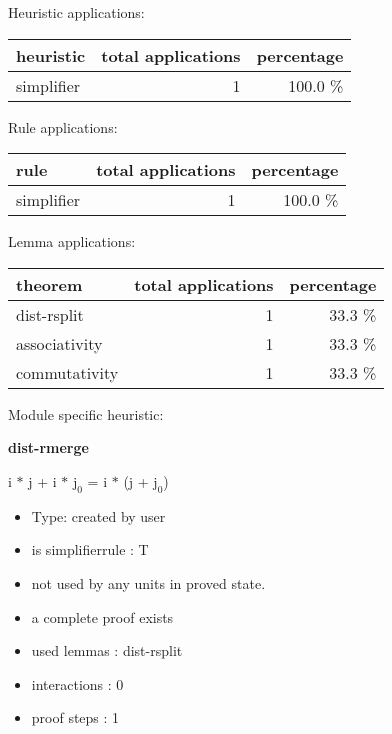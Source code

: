 \documentclass[a4paper]{article}
\begin{document}
Heuristic applications:

\begin{supertabular}{l|r|r}
heuristic	& total applications & percentage \\ \hline
simplifier & 1 & 100.0 \% \\

\end{supertabular}

Rule applications:

\begin{supertabular}{l|r|r}
rule	        & total applications & percentage \\ \hline
simplifier & 1 & 100.0 \% \\

\end{supertabular}

Lemma applications:

\begin{supertabular}{l|r|r}
theorem	        & total applications & percentage \\ \hline
dist-rsplit & 1 & 33.3 \% \\
associativity & 1 & 33.3 \% \\
commutativity & 1 & 33.3 \% \\

\end{supertabular}

Module specific heuristic:

\pagebreak

{\LARGE\bf dist-rmerge}\label{lemma-dist-rmerge}

\medskip

 \Fol i $*$ j + i $*$ $\mbox{j}_{0}$ = i $*$ (j + $\mbox{j}_{0}$)

\begin{itemize}

\item Type: created by user

\item is simplifierrule : T
\item not used by any units in proved state.
\item       a complete proof exists
\item       used lemmas  : dist-rsplit
\item       interactions : 0
\item       proof steps  : 1
\end{itemize}

\medskip
\end{document}
